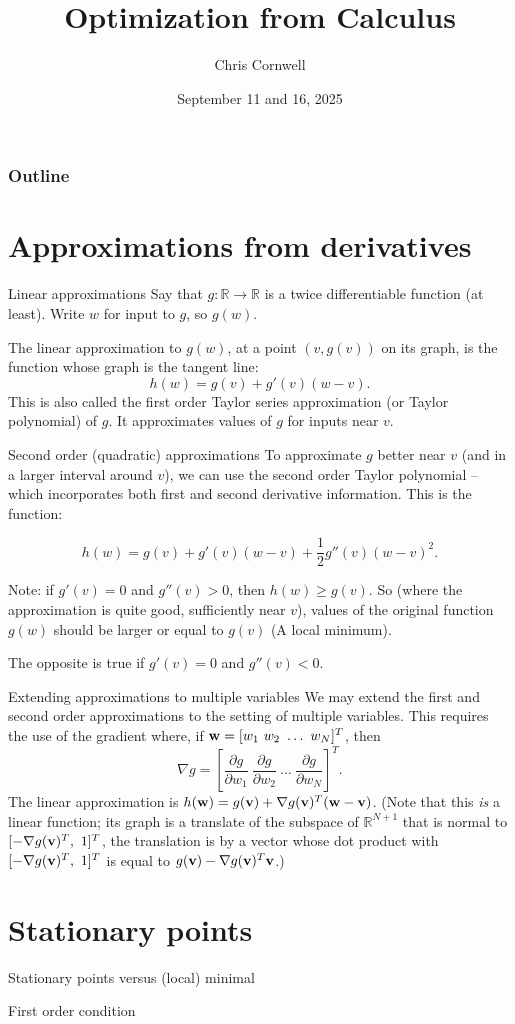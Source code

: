 \documentclass{beamer}
\author{Chris Cornwell}
\date{September 11 and 16, 2025}
\title{Optimization from Calculus}
\theoremstyle{example}
\newcommand{\bb}[1]{\mathbb{#1}}
\begin{document}
\begin{frame}
\titlepage
\end{frame}

\begin{frame}
\frametitle{Outline}
\tableofcontents
\end{frame}

\section{Approximations from derivatives}

\begin{frame}{Linear approximations}
    Say that $g:\bb R\to\bb R$ is a twice differentiable function (at least).  Write $w$ for input to $g$, so $g(w)$.

    The linear approximation to $g(w)$, at a point $(v, g(v))$ on its graph, is the function whose graph is the tangent line:
        \[h(w) = g(v) + g'(v)(w - v).\]
    This is also called the first order Taylor series approximation (or Taylor polynomial) of $g$. It approximates values of $g$ for inputs near $v$.

\end{frame}

\begin{frame}{Second order (quadratic) approximations}
    To approximate $g$ better near $v$ (and in a larger interval around $v$), we can use the second order Taylor polynomial {--} which incorporates both first and second derivative information.  This is the function:

    \[h(w) = g(v) + g'(v)(w - v) + \frac12g''(v)(w - v)^2.\]

    Note: if $g'(v) = 0$ and $g''(v) > 0$, then $h(w) \ge g(v)$. So (where the approximation is quite good, sufficiently near $v$), values of the original function $g(w)$ should be larger or equal to $g(v)$ (A local minimum).

    The opposite is true if $g'(v) = 0$ and $g''(v) < 0$.
\end{frame}

\begin{frame}{Extending approximations to multiple variables}
    We may extend the first and second order approximations to the setting of multiple variables. This requires the use of the gradient where, if ${\bf w} = [w_1\ w_2\ \ldots\ w_N]^T$, then 
        \[\nabla g = [\frac{\partial g}{\partial w_1}\ \frac{\partial g}{\partial w_2}\ \ldots\ \frac{\partial g}{\partial w_N}]^T.\]
    The linear approximation is $h({\bf w}) = g({\bf v}) + \nabla g({\bf v})^T({\bf w} - {\bf v})$. (Note that this \emph{is} a linear function; its graph is a translate of the subspace of $\bb R^{N+1}$ that is normal to $[-\nabla g({\bf v})^T,\ 1]^T$, the translation is by a vector whose dot product with $[-\nabla g({\bf v})^T,\ 1]^T$ is equal to $g({\bf v}) - \nabla g({\bf v})^T{\bf v}$.)
\end{frame}

\section{Stationary points}

\begin{frame}{Stationary points versus (local) minimal}
\end{frame}

\begin{frame}{First order condition}
\end{frame}
\end{document}
